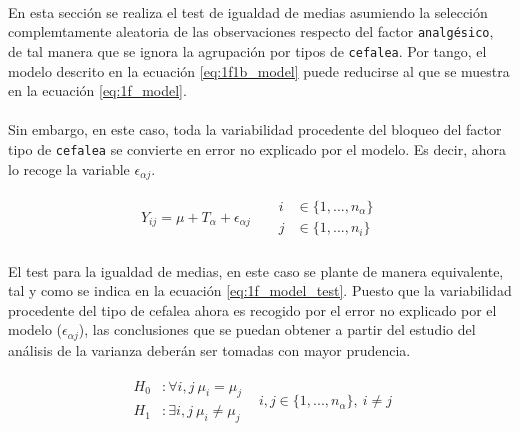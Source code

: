 \documentclass[11pt]{article}
\begin{document}
      \paragraph{}
      En esta sección se realiza el test de igualdad de medias asumiendo la selección complemtamente aleatoria de las observaciones respecto del factor \texttt{analgésico}, de tal manera que se ignora la agrupación por tipos de \texttt{cefalea}. Por tango, el modelo descrito en la ecuación \eqref{eq:1f1b_model} puede reducirse al que se muestra en la ecuación \eqref{eq:1f_model}.

      \paragraph{}
      Sin embargo, en este caso, toda la variabilidad procedente del bloqueo del factor tipo de \texttt{cefalea} se convierte en error no explicado por el modelo. Es decir, ahora lo recoge la variable $\epsilon_{\alpha j}$.

      \begin{align}
      \label{eq:1f_model}
        Y_{ij} = \mu + T_\alpha + \epsilon_{\alpha j}  &&
        \begin{split}
          i &\in \{1,...,n_\alpha\}\\
          j &\in \{1, ..., n_i\}
        \end{split}
      \end{align}

      \paragraph{}
      El test para la igualdad de medias, en este caso se plante de manera equivalente, tal y como se indica en la ecuación \eqref{eq:1f_model_test}. Puesto que la variabilidad procedente del tipo de cefalea ahora es recogido por el error no explicado por el modelo ($\epsilon_{\alpha j}$), las conclusiones que se puedan obtener a partir del estudio del análisis de la varianza deberán ser tomadas con mayor prudencia.

      \begin{align}
      \label{eq:1f_model_test}
        \begin{split}
          H_0 &: \forall i,j \ \mu_i = \mu_j  \\
          H_1 &: \exists i,j \ \mu_i \neq \mu_j
        \end{split} &
        i,j\in \{1,...,n_\alpha\}, \ i \neq j
      \end{align}
\end{document}
